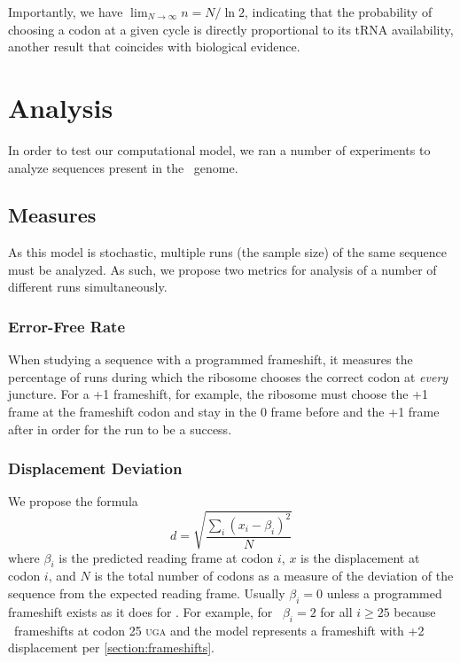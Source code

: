 \documentclass[12pt, draft]{article}
\numberwithin{equation}{section}
\begin{document}
Importantly, we have $\displaystyle\lim_{N\rightarrow\infty} n = N/\ln{2}$, indicating 
that the probability of choosing a codon at a given cycle is directly proportional 
to its tRNA availability, another result that coincides with biological evidence.
\section{Analysis}
In order to test our computational model, we ran a number of
experiments to analyze sequences present in the \ecoli\ genome.

\subsection{Measures}
\label{section:metrics}

As this model is stochastic, multiple runs (the sample size) of the same sequence must be analyzed.
As such, we propose two metrics for analysis of a number of different runs 
simultaneously. 

\subsubsection{Error-Free Rate}
When studying a
sequence with a programmed frameshift, it measures the percentage of runs 
during which the ribosome chooses the correct codon
at \emph{every} juncture.  For a +1 frameshift, for example, the ribosome must
choose the +1 frame at the frameshift codon and stay in the 0 frame before
and the +1 frame after in order for the run to be a success.

\subsubsection{Displacement Deviation}
\label{section:deviation}

We propose the formula
\begin{equation}
    d = \sqrt{\frac{\sum_i \left(x_i - \beta_i\right)^2}{N}}
\end{equation}
where $\beta_i$ is the predicted reading frame at codon $i$, $x$ is
the displacement at codon $i$, and $N$ is the total number of codons
as a measure of the deviation of the sequence from the expected
reading frame.  Usually $\beta_i = 0$ unless a programmed frameshift
exists as it does for \prfB.  For example, for \prfB\ $\beta_i = 2$
for all $i \geq 25$ because \prfB\ frameshifts at codon 25
\textsc{uga} and the model represents a frameshift with +2
displacement per \autoref{section:frameshifts}.
\end{document}
